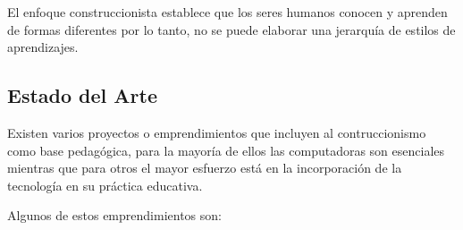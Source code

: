 El enfoque construccionista establece que los seres humanos conocen y aprenden
de formas diferentes por lo tanto, no se puede elaborar una jerarquía de estilos
de aprendizajes\cite{valdivia:sg}.

\subsection{Estado del Arte}


Existen varios proyectos o emprendimientos que incluyen al contruccionismo como base pedagógica,
para la mayoría de ellos las computadoras son esenciales mientras que para otros
el mayor esfuerzo está en la incorporación de la tecnología en su práctica
educativa\cite{papertian:const}.

Algunos de estos emprendimientos son:

